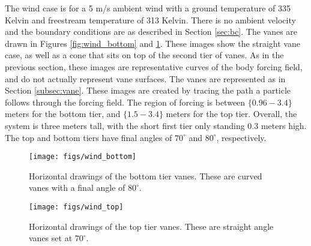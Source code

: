 The wind case is for a 5 m/s ambient wind with a ground temperature of
335 Kelvin and freestream temperature of 313 Kelvin. There is no ambient
velocity and the boundary conditions are as described in Section
\ref{sec:bc}. The vanes are drawn in Figures \ref{fig:wind_bottom} and
\ref{fig:wind_top}. These images show the straight vane case, as well as
a cone that sits on top of the second tier of vanes. 
As in the previous section, these images are representative
curves of the body forcing field, and do not actually represent vane
surfaces. The vanes are represented as in Section \ref{subsec:vane}. 
These images are created by tracing the path a particle follows through
the forcing field. The region of forcing is between $\{0.96-3.4\}$ meters
for the bottom tier, and $\{1.5-3.4\}$ meters for the top tier. Overall,
the system is three meters tall, with the short first tier only standing
0.3 meters high. The top and bottom tiers have final angles of
$70^{\circ}$ and $80^{\circ}$, respectively. 

\begin{figure}[htb]
\centering
\begin{minipage}{0.45\textwidth}
\centering
 \texttt{[image: figs/wind\_bottom]}
 \caption{Horizontal drawings of the bottom tier vanes. These are curved 
 vanes with a final angle of $80^{\circ}$.}
 \label{fig:wind_bottom}  
\end{minipage}\hfill
\begin{minipage}{0.45\textwidth}
\centering
\texttt{[image: figs/wind\_top]}
\caption{Horizontal drawings of the top tier vanes. These are straight
 angle vanes set at $70^{\circ}$.} 
 \label{fig:wind_top}  
\end{minipage}
\end{figure}


%
%




